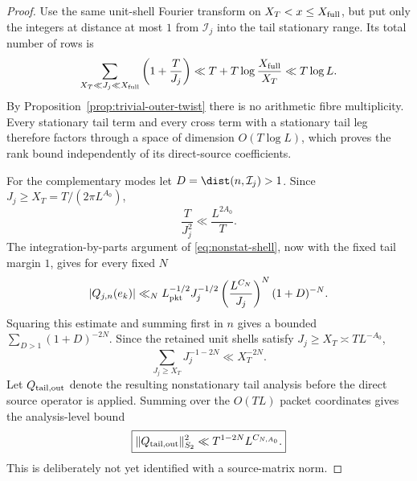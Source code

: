 \begin{proof}
Use the same unit-shell Fourier transform on $X_T<x\le X_{\rm full}$, but put
only the integers at distance at most $1$ from $\mathcal I_j$ into the tail
stationary range. Its total number of rows is
\[
\sum_{X_T\ll J_j\ll X_{\rm full}}
\left(1+\frac{T}{J_j}\right)
\ll T+T\log\frac{X_{\rm full}}{X_T}
\ll T\log L.
\]
By Proposition~\ref{prop:trivial-outer-twist} there is no arithmetic fibre
multiplicity. Every stationary tail term and every cross term with a
stationary tail leg therefore factors through a space of dimension
$O(T\log L)$, which proves the rank bound independently of its direct-source
coefficients.

For the complementary modes let $D=\dist(n,\mathcal I_j)>1$. Since
$J_j\ge X_T=T/(2\pi L^{A_0})$,
\[
\frac{T}{J_j^2}\ll\frac{L^{2A_0}}{T}.
\]
The integration-by-parts argument of \eqref{eq:nonstat-shell}, now with the
fixed tail margin $1$, gives for every fixed $N$
\[
|Q_{j,n}(e_k)|
\ll_N L_{\rm pkt}^{-1/2}J_j^{-1/2}
\left(\frac{L^{C_N}}{J_j}\right)^N(1+D)^{-N}.
\]
Squaring this estimate and summing first in $n$ gives a bounded
$\sum_{D>1}(1+D)^{-2N}$. Since the retained unit shells satisfy
$J_j\ge X_T\asymp T L^{-A_0}$,
\[
\sum_{J_j\ge X_T}J_j^{-1-2N}\ll X_T^{-2N}.
\]
Let $Q_{\rm tail,out}$ denote the resulting nonstationary tail analysis before
the direct source operator is applied. Summing over the $O(TL)$ packet
coordinates gives the analysis-level bound
\begin{equation}
\boxed{
\|Q_{\rm tail,out}\|_{S_2}^2
\ll T^{1-2N}L^{C_{N,A_0}}.
}
\label{eq:terminal-tail-analysis-HS}
\end{equation}
This is deliberately not yet identified with a source-matrix norm.


\end{proof}
